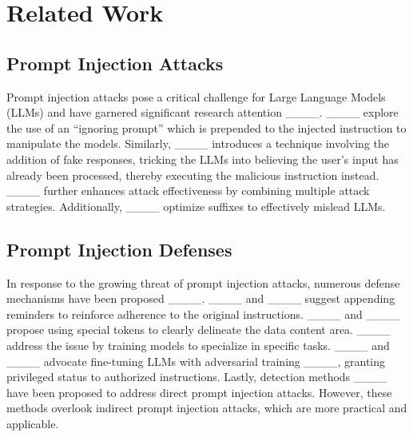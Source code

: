 \section{Related Work}
\subsection{Prompt Injection Attacks}
Prompt injection attacks pose a critical challenge for Large Language Models (LLMs) and have garnered significant research attention  ____. ____ explore the use of an ``ignoring prompt'' which is prepended to the injected instruction to manipulate the models. Similarly, ____ introduces a technique involving the addition of fake responses, tricking the LLMs into believing the user’s input has already been processed, thereby executing the malicious instruction instead. ____ further enhances attack effectiveness by combining multiple attack strategies. Additionally, ____ optimize suffixes to effectively mislead LLMs.

\subsection{Prompt Injection Defenses}
In response to the growing threat of prompt injection attacks, numerous defense mechanisms have been proposed  ____. ____ and ____ suggest appending reminders to reinforce adherence to the original instructions.  ____ and ____ propose using special tokens to clearly delineate the data content area. ____ address the issue by training models to specialize in specific tasks. ____ and ____ advocate fine-tuning LLMs with adversarial training ____, granting privileged status to authorized instructions. Lastly, detection methods ____ have been proposed to address direct prompt injection attacks. However, these methods overlook indirect prompt injection attacks, which are more practical and applicable.